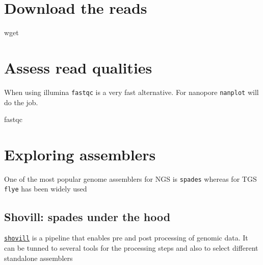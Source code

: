 \documentclass[
  letterpaper,
  DIV=11,
  numbers=noendperiod]{scrreprt}
\newenvironment{Shaded}{\begin{snugshade}}{\end{snugshade}}
\newcommand{\ExtensionTok}[1]{\textcolor[rgb]{0.00,0.46,0.62}{#1}}
\newcommand{\FunctionTok}[1]{\textcolor[rgb]{0.28,0.35,0.67}{#1}}
\begin{document}
\hypertarget{download-the-reads}{%
\section*{Download the reads}\label{download-the-reads}}

\hypertarget{downloading-seqs}{%
\label{downloading-seqs}}%
\begin{Shaded}
\begin{Highlighting}[]
\FunctionTok{wget}
\end{Highlighting}
\end{Shaded}

\hypertarget{assess-read-qualities}{%
\section*{Assess read qualities}\label{assess-read-qualities}}

When using illumina \texttt{fastqc} is a very fast alternative. For
nanopore \texttt{nanplot} will do the job.

\begin{Shaded}
\begin{Highlighting}[]
\ExtensionTok{fastqc}
\end{Highlighting}
\end{Shaded}

\hypertarget{exploring-assemblers}{%
\section*{Exploring assemblers}\label{exploring-assemblers}}

One of the most popular genome assemblers for NGS is \texttt{spades}
whereas for TGS \texttt{flye} has been widely used

\hypertarget{shovill-spades-under-the-hood}{%
\subsection*{Shovill: spades under the
hood}\label{shovill-spades-under-the-hood}}

\href{https://github.com/tseemann/shovill}{\texttt{shovill}} is a
pipeline that enables pre and post processing of genomic data. It can be
tunned to several tools for the processing steps and also to select
different standalone assemblers
\end{document}
